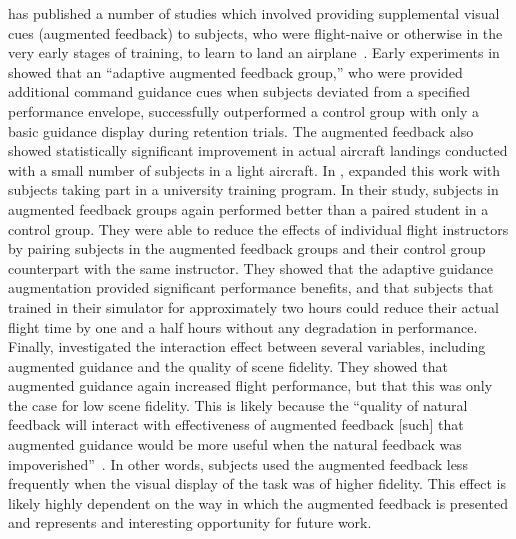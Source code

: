 \citeauthor{doi:10.1177/001872088002200109} has published a number of studies which involved providing supplemental visual cues (augmented feedback) to subjects, who were flight-naive or otherwise in the very early stages of training, to learn to land an airplane~\citep{doi:10.1177/001872088002200109, doi:10.1177/001872089003200305, doi:10.1207/s15327108ijap0702_4}.
Early experiments in \citeyear{doi:10.1177/001872088002200109} showed that an ``adaptive augmented feedback group,'' who were provided additional command guidance cues when subjects deviated from a specified performance envelope, successfully outperformed a control group with only a basic guidance display during retention trials.
The augmented feedback also showed statistically significant improvement in actual aircraft landings conducted with a small number of subjects in a light aircraft.
In \citeyear{doi:10.1177/001872089003200305}, \citeauthor{doi:10.1177/001872089003200305} expanded this work with subjects taking part in a university training program.
In their study, subjects in augmented feedback groups again performed better than a paired student in a control group.
They were able to reduce the effects of individual flight instructors by pairing subjects in the augmented feedback groups and their control group counterpart with the same instructor.
They showed that the adaptive guidance augmentation provided significant performance benefits, and that subjects that trained in their simulator for approximately two hours could reduce their actual flight time by one and a half hours without any degradation in performance.
Finally, \citet{doi:10.1207/s15327108ijap0702_4} investigated the interaction effect between several variables, including augmented guidance and the quality of scene fidelity.
They showed that augmented guidance again increased flight performance, but that this was only the case for low scene fidelity.
This is likely because the ``quality of natural feedback will interact with effectiveness of augmented feedback [such] that augmented guidance would be more useful when the natural feedback was impoverished''~\citep{doi:10.1207/s15327108ijap0702_4}.
In other words, subjects used the augmented feedback less frequently when the visual display of the task was of higher fidelity.
This effect is likely highly dependent on the way in which the augmented feedback is presented and represents and interesting opportunity for future work.

